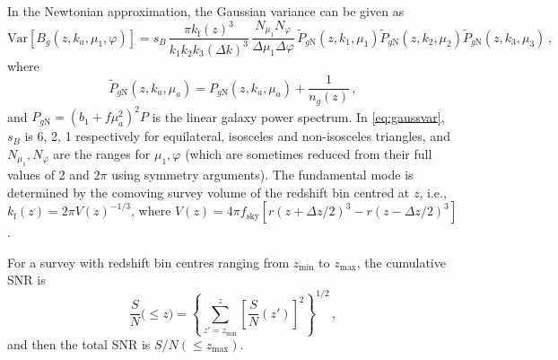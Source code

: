 In the Newtonian approximation, the Gaussian variance can be given as \cite{Scoccimarro:2003wn, Karagiannis:2018jdt}
\begin{equation}
{{\mathrm{Var}} [{B_{g}}(z, k_a,\mu_{1},\varphi)]}
=s_B\, \frac{\pi k_{\mathrm{f}}(z)^3}{k_1k_2k_3 (\Delta k)^3}\,\frac{N_{\mu_1}N_\varphi}{\Delta \mu_1 \Delta \varphi} \, \tilde{P}_{g{\mathrm{N}}}(z,k_{1},\mu_{1}) \tilde{P}_{g{\mathrm{N}}}(z,k_{2},\mu_{2})\tilde{P}_{g{\mathrm{N}}}(z,k_{3},\mu_{3})\,,
\label{eq:gaussvar} %
\end{equation}
where 
\begin{equation}
\tilde{P}_{g{\mathrm{N}}}(z, k_{a}, \mu_{a}) = P_{g{\mathrm{N}}}(z, k_{a}, \mu_{a}) + \frac{1}{n_{g}(z)}\,, \label{eq:Pgdef} %
\end{equation}
and ${P}_{g{\mathrm{N}}}=(b_1+f\mu_a^2)^2P$ is the linear galaxy power spectrum.
In \eqref{eq:gaussvar}, $s_{B}$ is 6, 2, 1 respectively for equilateral, isosceles and non-isosceles triangles, and $N_{\mu_1},N_\varphi$ are the ranges for $\mu_1,  \varphi $ (which are sometimes reduced from their full values of 2 and $2\pi$ using symmetry arguments).
The fundamental mode is determined by the comoving survey volume of the redshift bin centred at $z$, i.e.,  $k_{\mathrm{f}}(z) = {2\pi}{V(z)^{-1/3}}$, where $V(z)=4\pi  f_{\mathrm{sky}}[r(z+\Delta z/2)^3 - r(z-\Delta z/2)^3]$.

For a survey with redshift bin centres ranging from $z_{\mathrm{min}}$ to $z_{\mathrm{max}}$,  the cumulative SNR  is
\begin{equation} \label{csnr}
\frac{S}{N}\big(\leq z\big) = \left\{\sum_{z'=z_{\mathrm{min}}}^z \left[\frac{S}{N}(z')\right]^{2} \right\}^{1/2} \,,
\end{equation}
and then the total SNR is $S/N(\leq z_{\mathrm{max}})$.
%
%
